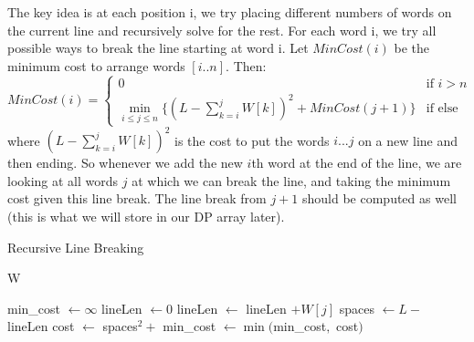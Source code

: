   \begin{algo}
    The key idea is at each position i, we try placing different numbers of words on the current line and recursively solve for the rest. For each word i, we try all possible ways to break the line starting at word i. Let $MinCost(i)$ be the minimum cost to arrange words $[i..n]$. Then:
    \begin{equation}
      MinCost(i) = 
      \begin{cases}
        0 & \text{if } i > n \\
        \min_{i \leq j \leq n} \big\{ (L - \sum_{k=i}^j W[k])^2 + MinCost(j+1) \big\} & \text{if else} 
      \end{cases}
    \end{equation}
    where $(L - \sum_{k=i}^j W[k])^2$ is the cost to put the words $i...j$ on a new line and then ending. So whenever we add the new $i$th word at the end of the line, we are looking at all words $j$ at which we can break the line, and taking the minimum cost given this line break. The line break from $j+1$ should be computed as well (this is what we will store in our DP array later). 

    \begin{algorithm}[H]
      \caption{Recursive Line Breaking}
      \label{alg:recline}
      \begin{algorithmic}
        \State W
          
            
            \State {}
          \EndIf

          \State min\_cost $\gets \infty$
          \State lineLen $\gets 0$
            
            \State lineLen $\gets$ lineLen $+ W[j]$
              
              \State spaces $\gets L -$ lineLen  
              \State cost $\gets$ spaces$^2 +$   
              \State min\_cost $\gets \min($min\_cost$,$ cost$)$
            \EndIf
          \EndFor
          \State {}
        \EndFunction
        
        \State {}  
      \end{algorithmic}
    \end{algorithm}
  \end{algo}

